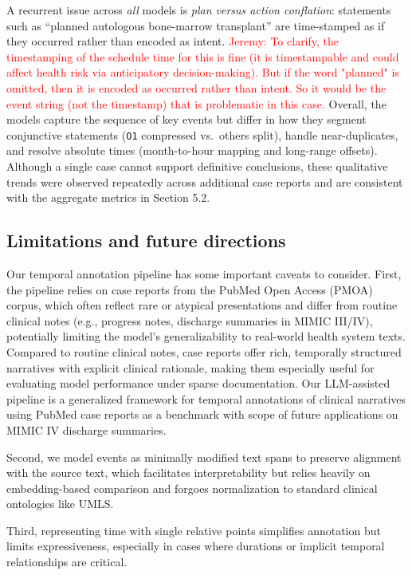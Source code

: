 A recurrent issue across \emph{all} models is \textit{plan versus action conflation}: statements such as ``planned autologous bone-marrow transplant'' are time-stamped as if they occurred rather than encoded as intent. \textcolor{red}{Jeremy: To clarify, the timestamping of the schedule time for this is fine (it is timestampable and could affect health risk via anticipatory decision-making).  But if the word "planned" is omitted, then it is encoded as occurred rather than intent. So it would be the event string (not the timestamp) that is problematic in this case.} 
Overall, the models capture the sequence of key events but differ in how they segment conjunctive statements (\texttt{O1} compressed vs.\ others split), handle near-duplicates, and resolve absolute times (month-to-hour mapping and long-range offsets). Although a single case cannot support definitive conclusions, these qualitative trends were observed repeatedly across additional case reports and are consistent with the aggregate metrics in Section 5.2.



\subsection{Limitations and future directions}

Our temporal annotation pipeline has some important caveats to consider. First, the pipeline relies on case reports from the PubMed Open Access (PMOA) corpus, which often reflect rare or atypical presentations and differ from routine clinical notes (e.g., progress notes, discharge summaries in MIMIC III/IV), potentially limiting the model’s generalizability to real-world health system texts. Compared to routine clinical notes, case reports offer rich, temporally structured narratives with explicit clinical rationale, making them especially useful for evaluating model performance under sparse documentation. Our LLM-assisted pipeline is a generalized framework for temporal annotations of clinical narratives using PubMed case reports as a benchmark with scope of future applications on MIMIC IV discharge summaries.  

Second, we model events as minimally modified text spans to preserve alignment with the source text, which facilitates interpretability but relies heavily on embedding-based comparison and forgoes normalization to standard clinical ontologies like UMLS.

Third, representing time with single relative points simplifies annotation but limits expressiveness, especially in cases where durations or implicit temporal relationships are critical. 

